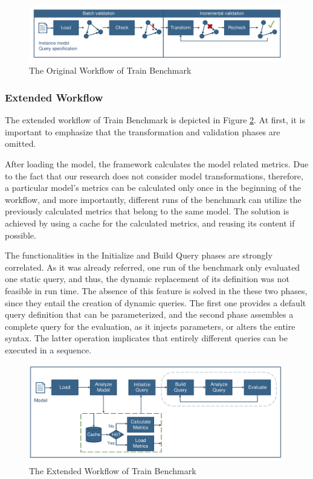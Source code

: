 \begin{figure}[!ht]
	\centering
	\includegraphics[width=150mm, keepaspectratio]{figures/trainbenchmark-sequence.pdf}
	\caption{The Original Workflow of Train Benchmark}
	\label{fig:old_train_workflow}
\end{figure}

\subsubsection{Extended Workflow}

The extended workflow of Train Benchmark is depicted in Figure \ref{fig:new_train_workflow}. At first, it is important to emphasize that the transformation and validation phases are omitted. 

After loading the model, the framework calculates the model related metrics. Due to the fact that our research does not consider model transformations, therefore, a particular model's metrics can be calculated only once in the beginning of the workflow, and more importantly, different runs of the benchmark can utilize the previously calculated metrics that belong to the same model. The solution is achieved by using a cache for the calculated metrics, and reusing its content if possible.

The functionalities in the \textsf{Initialize} and \textsf{Build Query} phases are strongly correlated. As it was already referred, one run of the benchmark only evaluated one static query, and thus, the dynamic replacement of its definition was not feasible in run time. The absence of this feature is solved in the these two phases, since they entail the creation of dynamic queries. The first one provides a default query definition that can be parameterized, and the second phase assembles a complete query for the evaluation, as it injects parameters, or alters the entire syntax. The latter operation implicates that entirely different queries can be executed in a sequence.

\begin{figure}[!ht]
	\centering
	\includegraphics[width=150mm, keepaspectratio]{figures/workflow.pdf}
	\caption{The Extended Workflow of Train Benchmark}
	\label{fig:new_train_workflow}
\end{figure}

